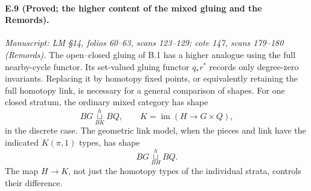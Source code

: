 \paragraph{E.9 (Proved; the higher content of the mixed gluing and the Remords).}
\textit{Manuscript: LM \S14, folios 60--63, scans 123--129; cote 147, scans 179--180 (Remords).}
The open--closed gluing of B.1 has a higher analogue using the full nearby-cycle functor. Its set-valued gluing functor $q_*r^*$ records only degree-zero invariants. Replacing it by homotopy fixed points, or equivalently retaining the full homotopy link, is necessary for a general comparison of shapes. For one closed stratum, the ordinary mixed category has shape
\[
 BG\mathop{\sqcup}\limits^{h}_{BK}BQ,
 \qquad K=\operatorname{im}(H\longrightarrow G\times Q),
                                                        \tag{E.9.1}
\]
in the discrete case. The geometric link model, when the pieces and link have the indicated $K(\pi,1)$ types, has shape
\[
 BG\mathop{\sqcup}\limits^{h}_{BH}BQ.
                                                        \tag{E.9.2}
\]
The map $H\to K$, not just the homotopy types of the individual strata, controls their difference.
